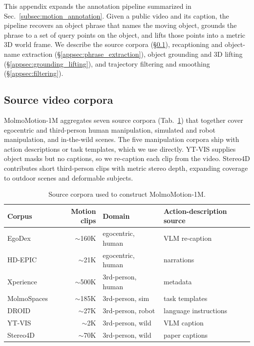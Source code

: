 \documentclass{llmxive}
\begin{document}
This appendix expands the annotation pipeline summarized in Sec.~\ref{subsec:motion_annotation}. Given a public video and its caption, the pipeline recovers an object phrase that names the moving object, grounds the phrase to a set of query points on the object, and lifts those points into a metric 3D world frame. We describe the source corpora (\S\ref{appsec:data_sources}), recaptioning and object-name extraction (\S\ref{appsec:phrase_extraction}), object grounding and 3D lifting (\S\ref{appsec:grounding_lifting}), and trajectory filtering and smoothing (\S\ref{appsec:filtering}).

\subsection{Source video corpora}
\label{appsec:data_sources}

MolmoMotion-1M aggregates seven source corpora (Tab.~\ref{tab:appendix-sources}) that together cover egocentric and third-person human manipulation, simulated and robot manipulation, and in-the-wild scenes. The five manipulation corpora ship with action descriptions or task templates, which we use directly. YT-VIS supplies object masks but no captions, so we re-caption each clip from the video. Stereo4D contributes short third-person clips with metric stereo depth, expanding coverage to outdoor scenes and deformable subjects.

\begin{table}[!htbp]
  \centering
  \small
  \setlength{\tabcolsep}{4pt}
  \begin{tabular}{lrll}
    Corpus     & Motion clips            & Domain            & Action-description source \\
    \midrule
    EgoDex      & $\sim$160K              & egocentric, human & VLM re-caption \\
    HD-EPIC     & $\sim$21K               & egocentric, human & narrations \\
    Xperience   & $\sim$500K              & 3rd-person, human & metadata \\
    MolmoSpaces & $\sim$185K              & 3rd-person, sim   & task templates \\
    DROID       & $\sim$27K               & 3rd-person, robot & language instructions \\
    YT-VIS      & $\sim$2K                & 3rd-person, wild  & VLM caption \\
    Stereo4D    & $\sim$70K               & 3rd-person, wild  & paper captions \\
  \end{tabular}
  \vspace{2mm}
  \caption{Source corpora used to construct MolmoMotion-1M.}
  \label{tab:appendix-sources}
\end{table}
\end{document}
